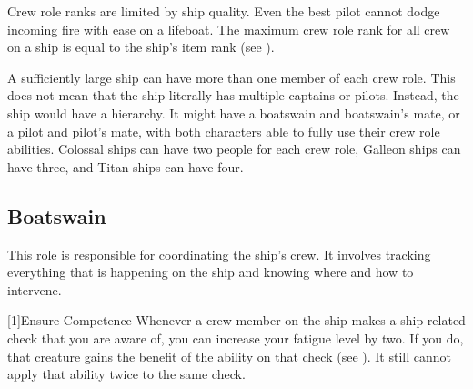     Crew role ranks are limited by ship quality.
    Even the best pilot cannot dodge incoming fire with ease on a lifeboat.
    The maximum crew role rank for all crew on a ship is equal to the ship's item rank (see ).

    A sufficiently large ship can have more than one member of each crew role.
    This does not mean that the ship literally has multiple captains or pilots.
    Instead, the ship would have a hierarchy.
    It might have a boatswain and boatswain's mate, or a pilot and pilot's mate, with both characters able to fully use their crew role abilities.
    Colossal ships can have two people for each crew role, Galleon ships can have three, and Titan ships can have four.


    \subsection{Boatswain}
        This role is responsible for coordinating the ship's crew.
        It involves tracking everything that is happening on the ship and knowing where and how to intervene.

        [1]{Ensure Competence} Whenever a crew member on the ship makes a ship-related check that you are aware of, you can increase your fatigue level by two.
        If you do, that creature gains the benefit of the  ability on that check (see ).
        It still cannot apply that ability twice to the same check.

